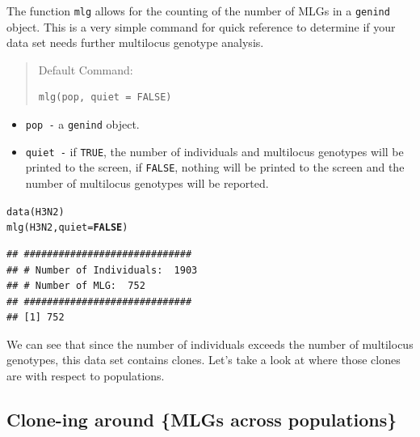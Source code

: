 \documentclass[letterpaper]{article}\usepackage[]{graphicx}\usepackage[]{color}
\makeatletter
\newcommand{\hlnum}[1]{\textcolor[rgb]{0.502,0,0.502}{\textbf{#1}}}%
\newcommand{\hlstd}[1]{\textcolor[rgb]{0,0,0}{#1}}%
\newcommand{\hlkwc}[1]{\textcolor[rgb]{0,0.502,0.753}{#1}}%
\newcommand{\hlkwd}[1]{\textcolor[rgb]{0,0.267,0.4}{#1}}%
\newenvironment{kframe}{%
 \def\at@end@of@kframe{}%
 \ifinner\ifhmode%
  \def\at@end@of@kframe{\end{minipage}}%
  \begin{minipage}{\columnwidth}%
 \fi\fi%
 \def\FrameCommand##1{\hskip\@totalleftmargin \hskip-\fboxsep
 \colorbox{shadecolor}{##1}\hskip-\fboxsep
     \hskip-\linewidth \hskip-\@totalleftmargin \hskip\columnwidth}%
 \MakeFramed {\advance\hsize-\width
   \@totalleftmargin\z@ \linewidth\hsize
   \@setminipage}}%
 {\par\unskip\endMakeFramed%
 \at@end@of@kframe}
\newenvironment{knitrout}{}{} %
\newcommand{\tab}{\hspace*{1em}}
\makeatother
\begin{document}
\tab\tab The function \texttt{mlg} allows for the counting of the number of MLGs in a \texttt{genind} object. This is a very simple command for quick reference to determine if your data set needs further multilocus genotype analysis.
\begin{quote}
Default Command:
\begin{knitrout}
\color{fgcolor}\begin{kframe}
\begin{verbatim}
mlg(pop, quiet = FALSE)
\end{verbatim}
\end{kframe}
\end{knitrout}

\end{quote}
  \begin{itemize}
    \item \texttt{pop -} a \texttt{genind} object.
    \item \texttt{quiet -} if \texttt{TRUE}, the number of individuals and multilocus genotypes will be printed to the screen, if \texttt{FALSE}, nothing will be printed to the screen and the number of multilocus genotypes will be reported.
  \end{itemize}
\begin{knitrout}\footnotesize
{}\color{fgcolor}\begin{kframe}
\begin{alltt}
\hlkwd{data}\hlstd{(H3N2)}
\hlkwd{mlg}\hlstd{(H3N2,} \hlkwc{quiet} \hlstd{=} \hlnum{FALSE}\hlstd{)}
\end{alltt}
\begin{verbatim}
## #############################
## # Number of Individuals:  1903 
## # Number of MLG:  752 
## #############################
## [1] 752
\end{verbatim}
\end{kframe}
\end{knitrout}

We can see that since the number of individuals exceeds the number of multilocus genotypes, this data set contains clones. Let's take a look at where those clones are with respect to populations.
\subsection{Clone-ing around \{MLGs across populations\}}\label{mlg:cross}
\end{document}
